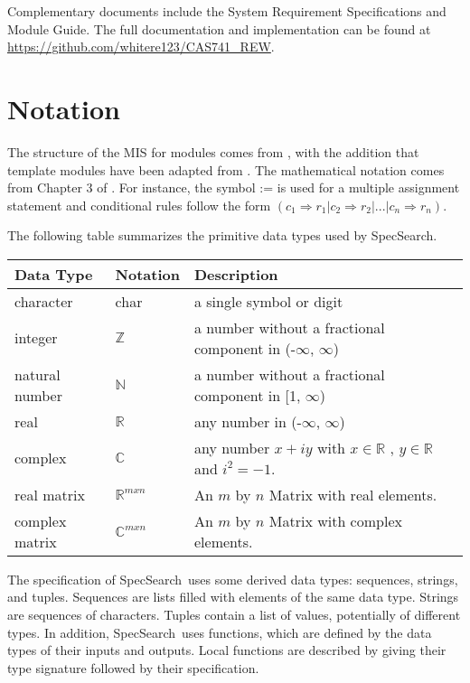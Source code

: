 \documentclass[12pt, titlepage]{article}
\newcommand{\progname}{SpecSearch}
\begin{document}
Complementary documents include the System Requirement Specifications
and Module Guide.  The full documentation and implementation can be
found at \url{https://github.com/whitere123/CAS741_REW}.
  
\section{Notation}

The structure of the MIS for modules comes from \citet{HoffmanAndStrooper1995},
with the addition that template modules have been adapted from
\cite{GhezziEtAl2003}.  The mathematical notation comes from Chapter 3 of
\citet{HoffmanAndStrooper1995}.  For instance, the symbol := is used for a
multiple assignment statement and conditional rules follow the form $(c_1
\Rightarrow r_1 | c_2 \Rightarrow r_2 | ... | c_n \Rightarrow r_n )$.

The following table summarizes the primitive data types used by \progname. 

\begin{center}
\renewcommand{\arraystretch}{1.2}
\noindent 
\begin{tabular}{l l p{7.5cm}} 
\toprule 
\textbf{Data Type} & \textbf{Notation} & \textbf{Description}\\ 
\midrule
character & char & a single symbol or digit\\
integer & $\mathbb{Z}$ & a number without a fractional component in (-$\infty$, $\infty$) \\
natural number & $\mathbb{N}$ & a number without a fractional component in [1, $\infty$) \\
real & $\mathbb{R}$ & any number in (-$\infty$, $\infty$)\\
complex & $\mathbb{C}$ &any number $x + iy$ with $x \in \mathbb{R}$ , $y \in 
\mathbb{R}$ and $i^{2} = -1$. \\ 
real matrix &$\mathbb{R}^{mxn}$ & An $m$ by $n$ Matrix with real elements.\\ 
complex matrix &$\mathbb{C}^{mxn}$ & An $m$ by $n$ Matrix with complex 
elements.\\
\bottomrule
\end{tabular} 
\end{center}

\noindent
The specification of \progname \ uses some derived data types: sequences, strings, and
tuples. Sequences are lists filled with elements of the same data type. Strings
are sequences of characters. Tuples contain a list of values, potentially of
different types. In addition, \progname \ uses functions, which
are defined by the data types of their inputs and outputs. Local functions are
described by giving their type signature followed by their specification.
\end{document}
